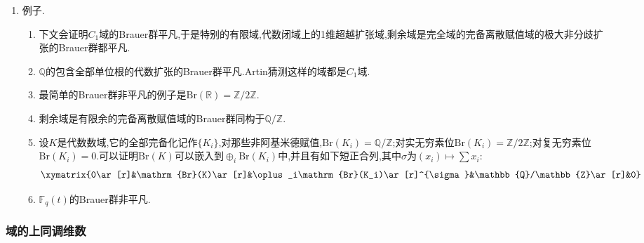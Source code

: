 \begin{enumerate}
\begin{proof}
    	如果(b)成立,那么明显有(a)和(c)成立.如果(a)或者(c)成立,对任意子群$H\le\mathrm{Gal}(L/K)$,结合Hilbert90定理有$\widetilde{\mathrm{H}}^1(H,L^*)=0$,(a)可以推出$\widetilde{\mathrm{H}}^2(H,L^*)=0$.于是此时(b)成立就是我们之前给出的有限群$G$关于模$A$的上同调如果对每个素数$p$都有$G_p$模$A$的某两个相邻的上同调群平凡,则$A$是上同调平凡$G$模.
    \end{proof}
    \item 例子.
    \begin{enumerate}
    	\item 下文会证明$C_1$域的Brauer群平凡,于是特别的有限域,代数闭域上的1维超越扩张域,剩余域是完全域的完备离散赋值域的极大非分歧扩张的Brauer群都平凡.
    	\item $\mathbb{Q}$的包含全部单位根的代数扩张的Brauer群平凡.Artin猜测这样的域都是$C_1$域.
    	\item 最简单的Brauer群非平凡的例子是$\mathrm{Br}(\mathbb{R})=\mathbb{Z}/2\mathbb{Z}$.
    	\item 剩余域是有限余的完备离散赋值域的Brauer群同构于$\mathbb{Q}/\mathbb{Z}$.
    	\item 设$K$是代数数域,它的全部完备化记作$\{K_i\}$,对那些非阿基米德赋值,$\mathrm{Br}(K_i)=\mathbb{Q}/\mathbb{Z}$;对实无穷素位$\mathrm{Br}(K_i)=\mathbb{Z}/2\mathbb{Z}$;对复无穷素位$\mathrm{Br}(K_i)=0$.可以证明$\mathrm{Br}(K)$可以嵌入到$\oplus_i\mathrm{Br}(K_i)$中,并且有如下短正合列,其中$\sigma$为$(x_i)\mapsto\sum x_i$:
    	$$\xymatrix{0\ar[r]&\mathrm{Br}(K)\ar[r]&\oplus_i\mathrm{Br}(K_i)\ar[r]^{\sigma}&\mathbb{Q}/\mathbb{Z}\ar[r]&0}$$
    	\item $\mathbb{F}_q(t)$的Brauer群非平凡.
    \end{enumerate}
\end{enumerate}
\subsubsection{域的上同调维数}

